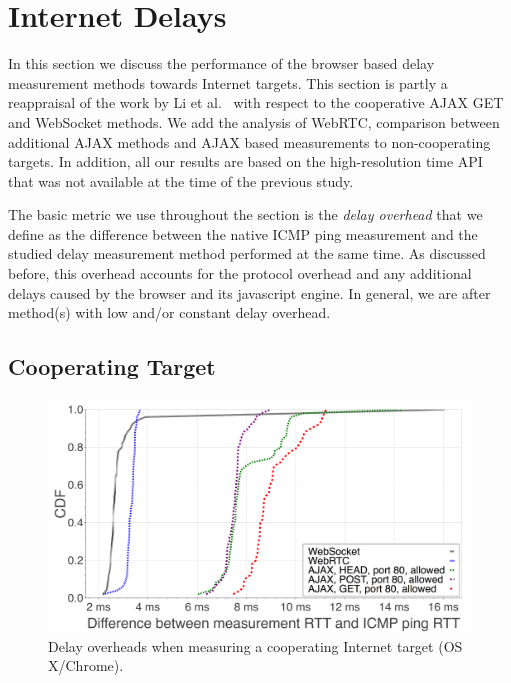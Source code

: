 \documentclass[12pt,twoside]{book}
\begin{document}
\section{Internet Delays}
\label{sec:servers}

In this section we discuss the performance of the browser based delay measurement methods towards Internet targets. This section is partly a reappraisal of the work by Li et al.~\cite{li:imc2013} with respect to the cooperative AJAX GET and WebSocket methods. We add the analysis of WebRTC, comparison between additional AJAX methods and AJAX based measurements to non-cooperating targets. In addition, all our results are based on the high-resolution time API that was not available at the time of the previous study.

The basic metric we use throughout the section is the \textit{delay overhead} that we define as the difference between the native ICMP ping measurement and the studied delay measurement method performed at the same time. As discussed before, this overhead accounts for the protocol overhead and any additional delays caused by the browser and its javascript engine. In general, we are after method(s) with low and/or constant delay overhead.

\subsection{Cooperating Target}

\begin{figure}[thb]
\includegraphics[width=\columnwidth]{figures/inet-coop}
\caption{Delay overheads when measuring a cooperating Internet target (OS X/Chrome).}
\label{fig:inet_coop}
\end{figure}
\vspace{-2mm}
\end{document}
